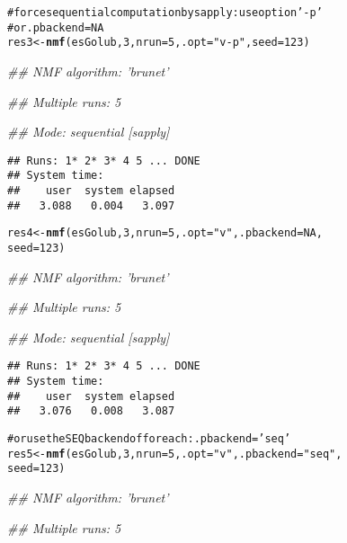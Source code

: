 \documentclass[a4paper]{article}\usepackage{graphicx, color}
\makeatletter
\newcommand{\hlfunctioncall}[1]{\textcolor[rgb]{0.501960784313725,0,0.329411764705882}{\textbf{#1}}}%
\newcommand{\hlstring}[1]{\textcolor[rgb]{0.6,0.6,1}{#1}}%
\newcommand{\hlcomment}[1]{\textcolor[rgb]{0.180392156862745,0.6,0.341176470588235}{#1}}%
\newenvironment{kframe}{%
 \def\at@end@of@kframe{}%
 \ifinner\ifhmode%
  \def\at@end@of@kframe{\end{minipage}}%
  \begin{minipage}{\columnwidth}%
 \fi\fi%
 \def\FrameCommand##1{\hskip\@totalleftmargin \hskip-\fboxsep
 \colorbox{shadecolor}{##1}\hskip-\fboxsep
     \hskip-\linewidth \hskip-\@totalleftmargin \hskip\columnwidth}%
 \MakeFramed {\advance\hsize-\width
   \@totalleftmargin\z@ \linewidth\hsize
   \@setminipage}}%
 {\par\unskip\endMakeFramed%
 \at@end@of@kframe}
\newenvironment{knitrout}{}{} %
\makeatother
\begin{document}
\begin{knitrout}
\begin{kframe}
\begin{alltt}
\hlcomment{# force sequential computation by sapply: use option \hlstring{'-p'}}
\hlcomment{# or .pbackend=NA}
res3 <- \hlfunctioncall{nmf}(esGolub, 3, nrun = 5, .opt = \hlstring{"v-p"}, seed = 123)
\end{alltt}


{\ttfamily\noindent\itshape\textcolor{messagecolor}{\#\# NMF algorithm: 'brunet'}}

{\ttfamily\noindent\itshape\textcolor{messagecolor}{\#\# Multiple runs: 5}}

{\ttfamily\noindent\itshape\textcolor{messagecolor}{\#\# Mode: sequential [sapply]}}\begin{verbatim}
## Runs: 1* 2* 3* 4 5 ... DONE
## System time:
##    user  system elapsed 
##   3.088   0.004   3.097
\end{verbatim}
\begin{alltt}
res4 <- \hlfunctioncall{nmf}(esGolub, 3, nrun = 5, .opt = \hlstring{"v"}, .pbackend = NA, 
    seed = 123)
\end{alltt}


{\ttfamily\noindent\itshape\textcolor{messagecolor}{\#\# NMF algorithm: 'brunet'}}

{\ttfamily\noindent\itshape\textcolor{messagecolor}{\#\# Multiple runs: 5}}

{\ttfamily\noindent\itshape\textcolor{messagecolor}{\#\# Mode: sequential [sapply]}}\begin{verbatim}
## Runs: 1* 2* 3* 4 5 ... DONE
## System time:
##    user  system elapsed 
##   3.076   0.008   3.087
\end{verbatim}
\begin{alltt}

\hlcomment{# or use the SEQ backend of foreach: .pbackend=\hlstring{'seq'}}
res5 <- \hlfunctioncall{nmf}(esGolub, 3, nrun = 5, .opt = \hlstring{"v"}, .pbackend = \hlstring{"seq"}, 
    seed = 123)
\end{alltt}


{\ttfamily\noindent\itshape\textcolor{messagecolor}{\#\# NMF algorithm: 'brunet'}}

{\ttfamily\noindent\itshape\textcolor{messagecolor}{\#\# Multiple runs: 5}}


\end{kframe}
\end{knitrout}
\end{document}
